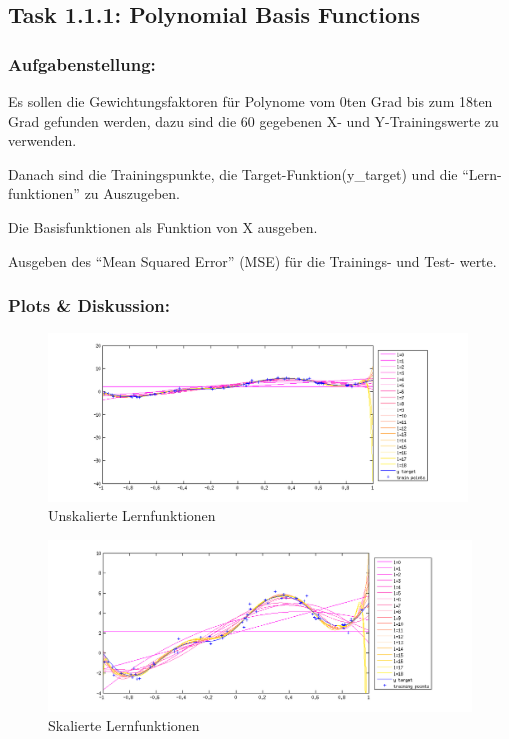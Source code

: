 \subsection{Task 1.1.1: Polynomial Basis Functions}

\subsubsection{Aufgabenstellung:}


Es sollen die Gewichtungsfaktoren für Polynome vom 0ten Grad bis zum 18ten Grad gefunden werden, dazu sind die 60 gegebenen X- und Y-Trainingswerte zu verwenden.


Danach sind die Trainingspunkte, die Target-Funktion(y\_target) und die ``Lern-funktionen'' zu Auszugeben.


Die Basisfunktionen als Funktion von X ausgeben.

Ausgeben des ``Mean Squared Error'' (MSE) für die Trainings- und Test- werte.


\subsubsection{Plots \& Diskussion:}
\begin{figure}[hp!]
\begin{center}
 \includegraphics[width=0.99\textwidth]{./figures/1_1_1_unscaled_learn_fct}
 \caption[Unskalierte Lernfunktionen]{Unskalierte Lernfunktionen}
\label{fig:unscaled_learn_fct}
\end{center}
\end{figure}


\begin{figure}[hp!]
\begin{center}
 \includegraphics[width=1\textwidth]{./figures/1_1_1_scal_learn_fct}
 \caption[Skalierte Lernfunktionen]{Skalierte Lernfunktionen}
\label{fig:scal_learn_fct}
\end{center}
\end{figure}

